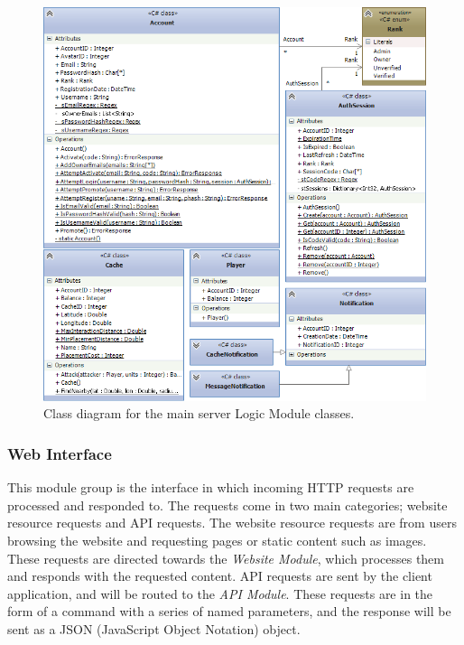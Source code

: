 \begin{figure}[h!]
    \centering
    \includegraphics[width=\textwidth]{svlogiccd}
    \caption{Class diagram for the main server Logic Module classes.}
\end{figure}

\subsubsection{Web Interface}
This module group is the interface in which incoming HTTP requests are processed and responded to. The requests come in two main categories; website resource requests and API requests. The website resource requests are from users browsing the website and requesting pages or static content such as images. These requests are directed towards the \emph{Website Module}, which processes them and responds with the requested content. API requests are sent by the client application, and will be routed to the \emph{API Module}. These requests are in the form of a command with a series of named parameters, and the response will be sent as a JSON (JavaScript Object Notation) object.

